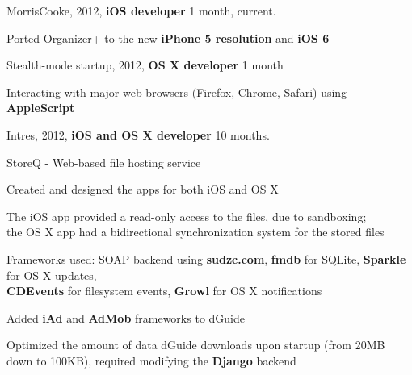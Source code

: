 \documentclass[letterpaper]{article}
\renewenvironment{itemize}{
  \begin{list}{}{
    \setlength{\leftmargin}{1.5em}
  }
}{
  \end{list}
}
\begin{document}
\begin{itemize}
    \item MorrisCooke, 2012, {\bf iOS developer} 1 month, current.
		\begin{itemize}

            \item Ported Organizer+ to the new {\bf iPhone 5 resolution} and {\bf iOS 6}

		\end{itemize}

	\item Stealth-mode startup, 2012, {\bf OS X developer} 1 month
		\begin{itemize}

			\item Interacting with major web browsers (Firefox, Chrome, Safari) using {\bf AppleScript}

		\end{itemize}

	\item Intres, 2012, {\bf iOS and OS X developer} 10 months.
		\begin{itemize}
            \item StoreQ - Web-based file hosting service
                \begin{itemize}
                    \item Created and designed the apps for both iOS and OS X
                    \item The iOS app provided a read-only access to the files, due to sandboxing;\\
                        the OS X app had a bidirectional synchronization system for the stored files
                    \item Frameworks used: SOAP backend using {\bf sudzc.com}, {\bf fmdb} for SQLite,
                        {\bf Sparkle} for OS X updates,\\ {\bf CDEvents} for filesystem events,
                        {\bf Growl} for OS X notifications
                \end{itemize}

            \item Added {\bf iAd} and {\bf AdMob} frameworks to dGuide

            \item Optimized the amount of data dGuide downloads upon startup (from 20MB down to 100KB),
                required modifying the {\bf Django} backend

    \end{itemize}


\end{itemize}
\end{document}
